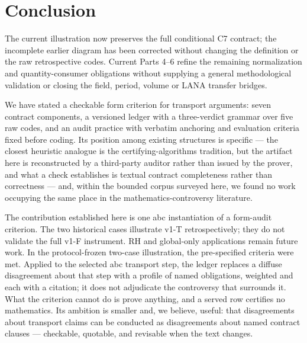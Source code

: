\documentclass[11pt,a4paper]{article}
\begin{document}
\section{Conclusion}\label{sec:conclusion}

The current illustration now preserves the full conditional C7 contract;
the incomplete earlier diagram has been corrected without changing the
definition or the raw retrospective codes. Current Parts 4--6 refine the
remaining normalization and quantity-consumer obligations without supplying
a general methodological validation or closing the field, period, volume
or LANA transfer bridges.



We have stated a checkable form criterion for transport arguments: seven
contract components, a versioned ledger with a three-verdict grammar over five
raw codes, and an audit practice with verbatim anchoring and evaluation
criteria fixed before coding. Its position among existing structures is
specific --- the closest heuristic analogue is the certifying-algorithms
tradition, but the artifact here is reconstructed by a third-party auditor
rather than issued by the prover, and what a check establishes is textual
contract completeness rather than correctness --- and, within the bounded
corpus surveyed here, we found no work occupying the same place in the
mathematics-controversy literature.

The contribution established here is one abc instantiation of a form-audit
criterion. The two historical cases illustrate v1-T retrospectively; they do
not validate the full v1-F instrument. RH and global-only applications remain
future work. In the protocol-frozen two-case illustration, the pre-specified
criteria were met. Applied to the selected abc transport step, the ledger
replaces a diffuse disagreement about that step with a profile of named
obligations, weighted and each with a citation; it does not adjudicate the
controversy that surrounds it. What the criterion cannot do is prove anything,
and a served row certifies no mathematics. Its ambition is smaller and, we
believe, useful: that disagreements about transport claims can be conducted as
disagreements about named contract clauses --- checkable, quotable, and
revisable when the text changes.


\end{document}
